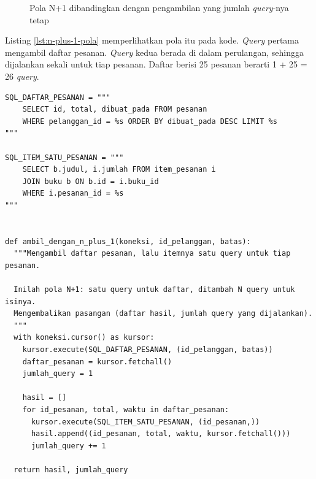 \begin{figure}[!htb]
  \centering
  \caption{Pola N+1 dibandingkan dengan pengambilan yang jumlah \textit{query}-nya tetap}
  \label{fig:n-plus-1}
\end{figure}

Listing \ref{lst:n-plus-1-pola} memperlihatkan pola itu pada kode. \textit{Query}
pertama mengambil daftar pesanan. \textit{Query} kedua berada di dalam perulangan,
sehingga dijalankan sekali untuk tiap pesanan. Daftar berisi 25 pesanan
berarti 1 + 25 = 26 \textit{query}.

\begin{lstlisting}[style=PythonStyle, caption={Pola N+1: satu query untuk tiap pesanan, tersedia di \berkas{sources/chapter03/n-plus-1.py}}, label={lst:n-plus-1-pola}]
SQL_DAFTAR_PESANAN = """
    SELECT id, total, dibuat_pada FROM pesanan
    WHERE pelanggan_id = %s ORDER BY dibuat_pada DESC LIMIT %s
"""

SQL_ITEM_SATU_PESANAN = """
    SELECT b.judul, i.jumlah FROM item_pesanan i
    JOIN buku b ON b.id = i.buku_id
    WHERE i.pesanan_id = %s
"""


def ambil_dengan_n_plus_1(koneksi, id_pelanggan, batas):
  """Mengambil daftar pesanan, lalu itemnya satu query untuk tiap pesanan.

  Inilah pola N+1: satu query untuk daftar, ditambah N query untuk isinya.
  Mengembalikan pasangan (daftar hasil, jumlah query yang dijalankan).
  """
  with koneksi.cursor() as kursor:
    kursor.execute(SQL_DAFTAR_PESANAN, (id_pelanggan, batas))
    daftar_pesanan = kursor.fetchall()
    jumlah_query = 1

    hasil = []
    for id_pesanan, total, waktu in daftar_pesanan:
      kursor.execute(SQL_ITEM_SATU_PESANAN, (id_pesanan,))
      hasil.append((id_pesanan, total, waktu, kursor.fetchall()))
      jumlah_query += 1

  return hasil, jumlah_query
\end{lstlisting}

